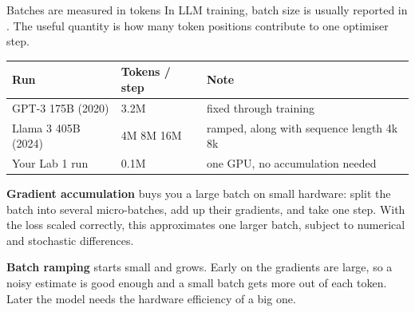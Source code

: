 \documentclass[aspectratio=169,10pt]{beamer}
\begin{document}
\begin{frame}[shrink=17]{Batches are measured in tokens}
  In LLM training, batch size is usually reported in . The useful
  quantity is how many token positions contribute to one optimiser step.

  \vspace{0.5em}
  \centering
  \begin{tabular}{@{}L{3.0cm} L{3.2cm} L{4.6cm}@{}}
    \toprule
    \textbf{Run} & \textbf{Tokens / step} & \textbf{Note}\\
    \midrule
    GPT-3 175B (2020) & 3.2M & fixed through training\\[0.3em]
    Llama 3 405B (2024) & 4M \textrightarrow{} 8M \textrightarrow{} 16M & ramped, along with
      sequence length 4k \textrightarrow{} 8k\\[0.3em]
    Your Lab 1 run & 0.1M & one GPU, no accumulation needed\\
    \bottomrule
  \end{tabular}

  \vspace{0.8em}
  \raggedright
  \textbf{Gradient accumulation} buys you a large batch on small hardware:
  split the batch into several micro-batches, add up their gradients, and take
  one step. With the loss scaled correctly, this approximates one larger batch,
  subject to numerical and stochastic differences.
  \vspace{0.4em}

  \textbf{Batch ramping} starts small and grows. Early on the gradients are
  large, so a noisy estimate is good enough and a small batch gets more out of
  each token. Later the model needs the hardware efficiency of a big one.
\end{frame}
\end{document}

